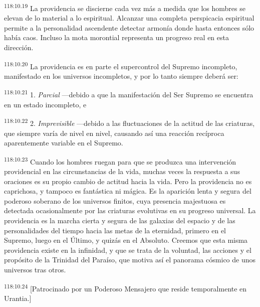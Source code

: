 \documentclass[twoside, 11pt]{book}
\begin{document}
\par
\textsuperscript{118:10.19} La providencia se discierne cada vez más a medida que los hombres se elevan de lo material a lo espiritual. Alcanzar una completa perspicacia espiritual permite a la personalidad ascendente detectar armonía donde hasta entonces sólo había caos. Incluso la mota morontial representa un progreso real en esta dirección.

\par
\textsuperscript{118:10.20} La providencia es en parte el supercontrol del Supremo incompleto, manifestado en los universos incompletos, y por lo tanto siempre deberá ser:

\par
\textsuperscript{118:10.21} 1. \textit{Parcial} ---debido a que la manifestación del Ser Supremo se encuentra en un estado incompleto, e

\par
\textsuperscript{118:10.22} 2. \textit{Imprevisible} ---debido a las fluctuaciones de la actitud de las criaturas, que siempre varía de nivel en nivel, causando así una reacción recíproca aparentemente variable en el Supremo.

\par
\textsuperscript{118:10.23} Cuando los hombres ruegan para que se produzca una intervención providencial en las circunstancias de la vida, muchas veces la respuesta a sus oraciones es su propio cambio de actitud hacia la vida. Pero la providencia no es caprichosa, y tampoco es fantástica ni mágica. Es la aparición lenta y segura del poderoso soberano de los universos finitos, cuya presencia majestuosa es detectada ocasionalmente por las criaturas evolutivas en su progreso universal. La providencia es la marcha cierta y segura de las galaxias del espacio y de las personalidades del tiempo hacia las metas de la eternidad, primero en el Supremo, luego en el Último, y quizás en el Absoluto. Creemos que esta misma providencia existe en la infinidad, y que se trata de la voluntad, las acciones y el propósito de la Trinidad del Paraíso, que motiva así el panorama cósmico de unos universos tras otros.

\par
\textsuperscript{118:10.24} [Patrocinado por un Poderoso Mensajero que reside temporalmente en Urantia.]


\newpage
\pagestyle{empty}
\end{document}

